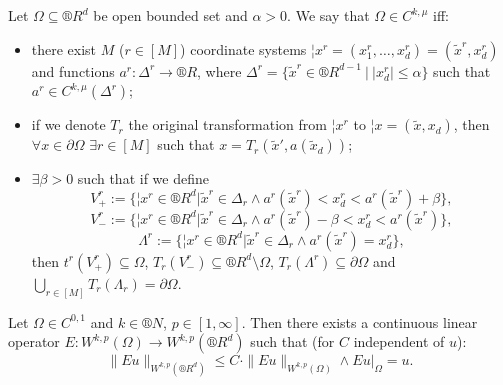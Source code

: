 \documentclass[12pt]{article}					%
\begin{document}
\begin{definice}
	Let $\Omega \subseteq ®R^d$ be open bounded set and $\alpha > 0$. We say that $\Omega \in C^{k, \mu}$ iff:

	\begin{itemize}
		\item there exist $M$ ($r \in [M]$) coordinate systems $¦x^r = (x_1^r, …, x_d^r) = (\tilde x^r, x_d^r)$ and functions $a^r: \Delta^r \rightarrow ®R$, where $\Delta^r = \{\tilde x^r \in ®R^{d - 1}\ |\ |x_d^r| ≤ \alpha\}$ such that $a^r \in C^{k, \mu}(\Delta^r)$;
		\item if we denote $T_r$ the original transformation from $¦x^r$ to $¦x = (\tilde x, x_d)$, then $\forall x \in \partial\Omega$ $\exists r \in [M]$ such that $x = T_r(\tilde x', a(\tilde x_d))$;
		\item $\exists \beta > 0$ such that if we define
			$$ V_+^r := \{¦x^r \in ®R^d | \tilde x^r \in \Delta_r \land a^r(\tilde x^r) < x_d^r < a^r(\tilde x^r) + \beta\}, $$
			$$ V_-^r := \{¦x^r \in ®R^d | \tilde x^r \in \Delta_r \land a^r(\tilde x^r) - \beta < x_d^r < a^r(\tilde x^r)\}, $$
			$$ \Lambda^r := \{¦x^r \in ®R^d | \tilde x^r \in \Delta_r \land a^r(\tilde x^r) = x_d^r\}, $$
			then $t^r(V_+^r) \subseteq \Omega$, $T_r(V_-^r) \subseteq ®R^d \setminus \Omega$, $T_r(\Lambda^r) \subseteq \partial \Omega$ and $\bigcup_{r\in[M]} T_r(\Lambda_r) = \partial \Omega$.
	\end{itemize}
\end{definice}

\begin{veta}
	Let $\Omega \in C^{0, 1}$ and $k \in ®N$, $p \in [1, ∞]$. Then there exists a continuous linear operator $E: W^{k, p}(\Omega) \rightarrow W^{k, p}(®R^d)$ such that (for $C$ independent of $u$):
	$$ \|E u\|_{W^{k, p}(®R^d)} ≤ C·\|E u\|_{W^{k, p}(\Omega)} \land E u |_\Omega = u. $$
\end{veta}
\end{document}

